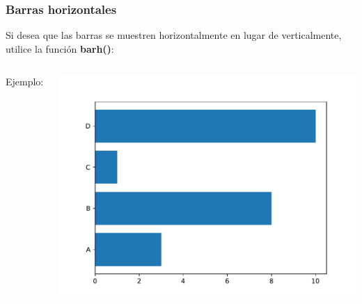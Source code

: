 \begin{frame}[fragile]
  \frametitle{Barras horizontales}
  Si desea que las barras se muestren horizontalmente
  en lugar de verticalmente, utilice la función \textbf{barh()}:
  \begin{columns}
        \begin{exampleblock}{Ejemplo:}
          
        \end{exampleblock}
      \pausa
      \begin{center}
          \includegraphics[scale=0.5]{ejemplos/e08.pdf}
      \end{center}
  \end{columns}
\end{frame}

